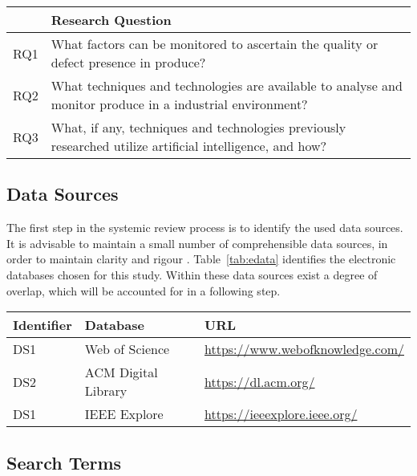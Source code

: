\documentclass[conference]{IEEEtran}
\begin{document}
\begin{table*}
    \caption{Research Questions}
    \label{tab:resquest}

    \begin{tabular}{ll}
    \hline
        & \textbf{Research Question}\\
    \hline
        RQ1 & What factors can be monitored to ascertain the quality or defect presence in produce? \\
        RQ2 &  What techniques and technologies are available to analyse and monitor produce in a industrial environment?\\
        RQ3 & What, if any, techniques and technologies previously researched utilize artificial intelligence, and how? \\
    \hline
    \end{tabular}
\end{table*}

\subsection{Data Sources}


The first step in the systemic review process is to identify the used data sources. It is advisable
to maintain a small number of comprehensible data sources, in order to maintain clarity and rigour \cite{Par2015}. Table~\ref{tab:edata} identifies the electronic databases chosen for this study. Within these data sources exist a degree of overlap, which will be accounted for in a following step.

\begin{table*}
    \caption{Electronic databases}
    \label{tab:edata}
    \centering

    \begin{tabular}{lll}
    \hline
        Identifier & Database & URL \\
    \hline
        DS1 & Web of Science & \url{https://www.webofknowledge.com/} \\
        DS2 & ACM Digital Library & \url{https://dl.acm.org/} \\
        DS1 & IEEE Explore & \url{https://ieeexplore.ieee.org/} \\
    \hline

    \hline
    \end{tabular}
\end{table*}

\subsection{Search Terms}
\end{document}
